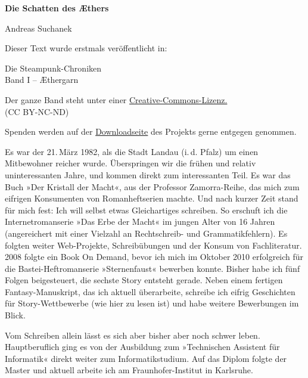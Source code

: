 \usepackage[ngerman]{babel}
\usepackage[T1]{fontenc}



\renewcommand*{\tb}{\begin{center}* \quad * \quad *\end{center}}

\newcommand\bigpar\medskip


\raggedbottom
\begin{center}
\textbf{\huge\textsf{Die Schatten des Æthers}}

\bigskip
Andreas Suchanek
\end{center}

\bigskip

\begin{flushleft}
Dieser Text wurde erstmals veröffentlicht in:
\begin{center}
Die Steampunk-Chroniken\\
Band I -- Æthergarn
\end{center}

\bigskip

Der ganze Band steht unter einer
\href{http://creativecommons.org/licenses/by-nc-nd/2.0/de/}{Creative-Commons-Lizenz.} \\
(CC BY-NC-ND)

\bigskip

Spenden werden auf der
\href{http://steampunk-chroniken.de/download}{Downloadseite}
des Projekts gerne entgegen genommen.

\vfill

Es war der 21.\,März 1982, als die Stadt Landau (i.\,d. Pfalz) um
einen Mitbewohner reicher wurde. Überspringen wir die frühen und
relativ uninteressanten Jahre, und kommen direkt zum interessanten
Teil. Es war das Buch »Der Kristall der Macht«, aus der Professor
Zamorra-Reihe, das mich zum eifrigen Konsumenten von
Romanheftserien machte. Und nach kurzer Zeit stand für mich fest:
Ich will selbst etwas Gleichartiges schreiben. So erschuft ich die
Internetromanserie »Das Erbe der Macht« im jungen Alter von 16
Jahren (angereichert mit einer Vielzahl an Rechtschreib- und
Grammatikfehlern). Es folgten weiter Web-Projekte, Schreibübungen
und der Konsum von Fachliteratur. 2008 folgte ein Book On Demand,
bevor ich mich im Oktober 2010 erfolgreich für die
Bastei-Heftromanserie »Sternenfaust« bewerben konnte. Bisher habe
ich fünf Folgen beigesteuert, die sechste Story entsteht gerade.
Neben einem fertigen Fantasy-Manuskript, das ich aktuell
überarbeite, schreibe ich eifrig Geschichten für Story-Wettbewerbe
(wie hier zu lesen ist) und habe weitere Bewerbungen im Blick.

\bigpar

Vom Schreiben allein lässt es sich aber bisher aber noch schwer
leben. Hauptberuflich ging es von der Ausbildung zum »Technischen
Assistent für Informatik« direkt weiter zum Informatikstudium. Auf
das Diplom folgte der Master und aktuell arbeite ich am
Fraunhofer-Institut in Karlsruhe.
\end{flushleft}

